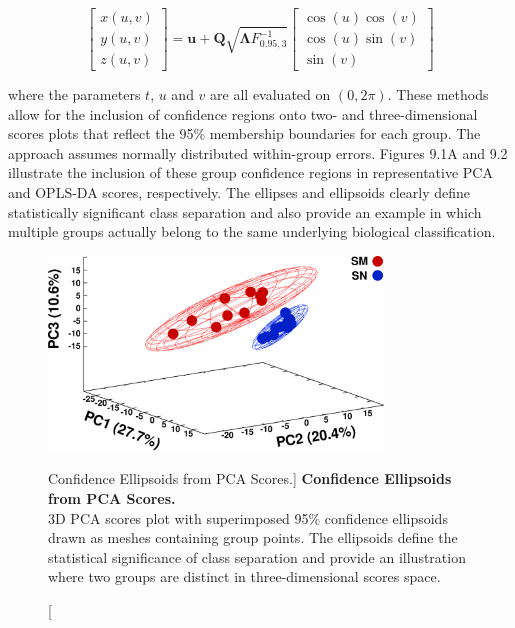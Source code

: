 \begin{equation}
\begin{bmatrix}
x(u,v) \\
y(u,v) \\
z(u,v)
\end{bmatrix}
 = \mathbf{u} + \mathbf{Q} \sqrt{\mathbf{\Lambda} F_{0.95,3}^{-1}}
\begin{bmatrix}
\cos(u) \cos(v) \\
\cos(u) \sin(v) \\
\sin(v)
\end{bmatrix}
\end{equation}

\begin{doublespace}
where the parameters $t$, $u$ and $v$ are all evaluated on $(0,2\pi)$. These
methods allow for the inclusion of confidence regions onto two- and
three-dimensional scores plots that reflect the 95\% membership boundaries
for each group. The approach assumes normally distributed within-group errors.
Figures 9.1A and 9.2 illustrate the inclusion of these group confidence regions
in representative PCA and OPLS-DA scores, respectively. The ellipses and
ellipsoids clearly define statistically significant class separation and also
provide an example in which multiple groups actually belong to the same
underlying biological classification.
\end{doublespace}

\begin{figure}
\includegraphics[width=3.5in]{figs/utils/02-pca.png}
\caption
      [Confidence Ellipsoids from PCA Scores.]{
  {\bf Confidence Ellipsoids from PCA Scores.}
  \\
  3D PCA scores plot with superimposed 95\% confidence ellipsoids drawn as
  meshes containing group points. The ellipsoids define the statistical
  significance of class separation and provide an illustration where two
  groups are distinct in three-dimensional scores space.
}
\end{figure}

